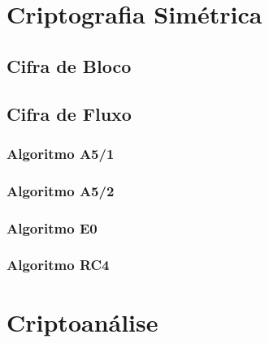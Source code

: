 %
\section{Criptografia Simétrica}
\label{symmetric-cryptography}

\subsection{Cifra de Bloco}
\label{block-cipher}

\subsection{Cifra de Fluxo}
\label{stream-cipher}

\subsubsection{Algoritmo A5/1}
\label{algorithm-a51}

\subsubsection{Algoritmo A5/2}
\label{algorithm-a52}

\subsubsection{Algoritmo E0}
\label{algorithm-e0}

\subsubsection{Algoritmo RC4}
\label{algorithm-rc4}

\section{Criptoanálise}
